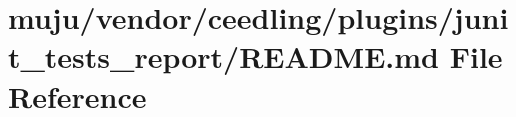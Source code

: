 \hypertarget{vendor_2ceedling_2plugins_2junit__tests__report_2_r_e_a_d_m_e_8md}{}\section{muju/vendor/ceedling/plugins/junit\+\_\+tests\+\_\+report/\+R\+E\+A\+D\+ME.md File Reference}
\label{vendor_2ceedling_2plugins_2junit__tests__report_2_r_e_a_d_m_e_8md}
